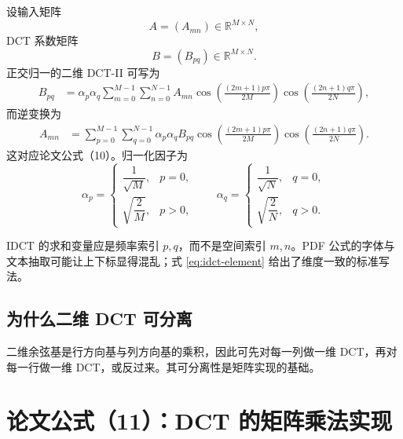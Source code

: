 \documentclass[UTF8,12pt,a4paper,fontset=none]{ctexart}
\numberwithin{equation}{section}
\newcommand{\R}{\mathbb{R}}
\begin{document}
设输入矩阵
\begin{equation}
  A=(A_{mn})\in\R^{M\times N},
\end{equation}
DCT 系数矩阵
\begin{equation}
  B=(B_{pq})\in\R^{M\times N}.
\end{equation}
正交归一的二维 DCT-II 可写为
\begin{align}
  B_{pq}
  &=\alpha_p\alpha_q
  \sum_{m=0}^{M-1}\sum_{n=0}^{N-1}
  A_{mn}
  \cos\left(\frac{(2m+1)p\pi}{2M}\right)
  \cos\left(\frac{(2n+1)q\pi}{2N}\right),
  \label{eq:dct-element}
\end{align}
而逆变换为
\begin{align}
  A_{mn}
  &=\sum_{p=0}^{M-1}\sum_{q=0}^{N-1}
  \alpha_p\alpha_q B_{pq}
  \cos\left(\frac{(2m+1)p\pi}{2M}\right)
  \cos\left(\frac{(2n+1)q\pi}{2N}\right).
  \label{eq:idct-element}
\end{align}
这对应论文公式（10）。归一化因子为
\begin{equation}
  \alpha_p=
  \begin{cases}
    \dfrac{1}{\sqrt{M}},&p=0,\\[0.35em]
    \sqrt{\dfrac{2}{M}},&p>0,
  \end{cases}
  \qquad
  \alpha_q=
  \begin{cases}
    \dfrac{1}{\sqrt{N}},&q=0,\\[0.35em]
    \sqrt{\dfrac{2}{N}},&q>0.
  \end{cases}
  \tag{10}
  \label{eq:paper10}
\end{equation}

\begin{criticalbox}[原文排版中容易误读的一点]
IDCT 的求和变量应是频率索引 $p,q$，而不是空间索引 $m,n$。PDF 公式的字体与文本抽取可能让上下标显得混乱；式 \eqref{eq:idct-element} 给出了维度一致的标准写法。
\end{criticalbox}

\subsection{为什么二维 DCT 可分离}

二维余弦基是行方向基与列方向基的乘积，因此可先对每一列做一维 DCT，再对每一行做一维 DCT，或反过来。其可分离性是矩阵实现的基础。

\section{论文公式（11）：DCT 的矩阵乘法实现}
\end{document}
